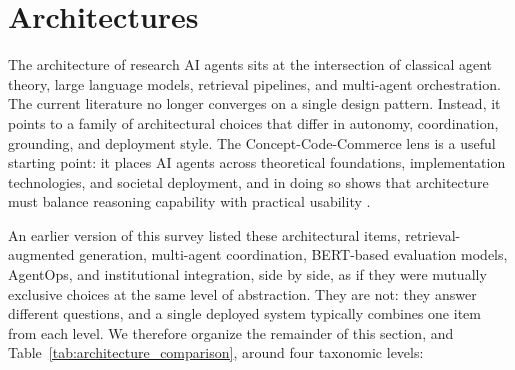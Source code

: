 \documentclass[sn-basic,Numbered]{sn-jnl}
\begin{document}
\section{Architectures}
\label{sec:architectures}

The architecture of research AI agents sits at the intersection of
classical agent theory, large language models, retrieval pipelines,
and multi-agent orchestration. The current literature no longer
converges on a single design pattern. Instead, it points to a family
of architectural choices that differ in autonomy, coordination,
grounding, and deployment style. The Concept-Code-Commerce lens is a
useful starting point: it places AI agents across theoretical
foundations, implementation technologies, and societal deployment, and
in doing so shows that architecture must balance reasoning capability
with practical usability \cite{ishida2025conceptcodecommerce}.

An earlier version of this survey listed these architectural items,
retrieval-augmented generation, multi-agent coordination, BERT-based
evaluation models, AgentOps, and institutional integration, side by
side, as if they were mutually exclusive choices at the same level of
abstraction. They are not: they answer different questions, and a
single deployed system typically combines one item from each level.
We therefore organize the remainder of this section, and
Table~\ref{tab:architecture_comparison}, around four taxonomic levels:
\end{document}
